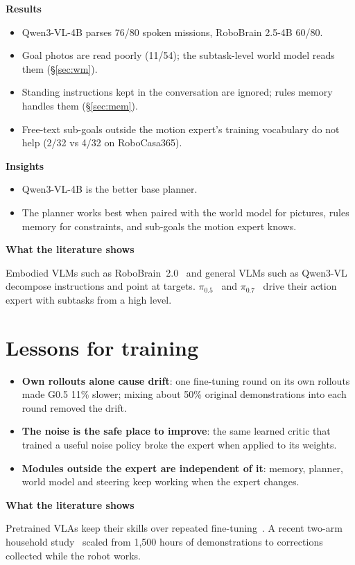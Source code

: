 \documentclass[11pt,a4paper]{article}
\newcommand{\pzf}{$\pi_{0.5}$}
\newcommand{\pzs}{$\pi_{0.7}$}
\newcommand{\sub}[1]{\par\needspace{4\baselineskip}\smallskip\noindent\textbf{#1}\par}
\begin{document}
\sub{Results}
\begin{itemize}
\item Qwen3-VL-4B parses 76/80 spoken missions, RoboBrain 2.5-4B 60/80.
\item Goal photos are read poorly (11/54); the subtask-level world model reads them (\S\ref{sec:wm}).
\item Standing instructions kept in the conversation are ignored; rules memory handles them (\S\ref{sec:mem}).
\item Free-text sub-goals outside the motion expert's training vocabulary do not help (2/32 vs 4/32 on RoboCasa365).
\end{itemize}

\sub{Insights}
\begin{itemize}
\item Qwen3-VL-4B is the better base planner.
\item The planner works best when paired with the world model for pictures, rules memory for constraints, and sub-goals the motion expert knows.
\end{itemize}

\sub{What the literature shows}
Embodied VLMs such as RoboBrain~2.0~\cite{robobrain} and general VLMs such as Qwen3-VL~\cite{qwen3vl} decompose instructions and point at targets. \pzf~\cite{pi05} and \pzs~\cite{pi07} drive their action expert with subtasks from a high level.

\section{Lessons for training}
\label{sec:lessons}
\begin{itemize}
\item \textbf{Own rollouts alone cause drift}: one fine-tuning round on its own rollouts made G0.5 11\% slower; mixing about 50\% original demonstrations into each round removed the drift.
\item \textbf{The noise is the safe place to improve}: the same learned critic that trained a useful noise policy broke the expert when applied to its weights.
\item \textbf{Modules outside the expert are independent of it}: memory, planner, world model and steering keep working when the expert changes.
\end{itemize}

\sub{What the literature shows}
Pretrained VLAs keep their skills over repeated fine-tuning~\cite{vla_forget}. A recent two-arm household study~\cite{agibot} scaled from 1,500 hours of demonstrations to corrections collected while the robot works.
\end{document}
